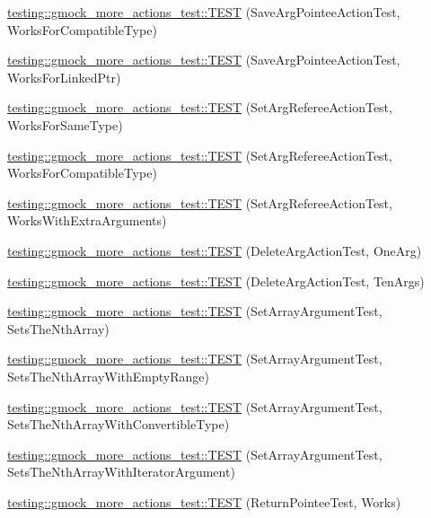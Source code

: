 \begin{DoxyCompactItemize}
\hyperlink{namespacetesting_1_1gmock__more__actions__test_a35b74b32b6a222e048706e6ce8d64118}{testing\+::gmock\+\_\+more\+\_\+actions\+\_\+test\+::\+T\+E\+ST} (Save\+Arg\+Pointee\+Action\+Test, Works\+For\+Compatible\+Type)
\item 
\hyperlink{namespacetesting_1_1gmock__more__actions__test_afc168d80fe8ca16f0efc874587574e64}{testing\+::gmock\+\_\+more\+\_\+actions\+\_\+test\+::\+T\+E\+ST} (Save\+Arg\+Pointee\+Action\+Test, Works\+For\+Linked\+Ptr)
\item 
\hyperlink{namespacetesting_1_1gmock__more__actions__test_aa9fa575b30dca09e9886722b78415a22}{testing\+::gmock\+\_\+more\+\_\+actions\+\_\+test\+::\+T\+E\+ST} (Set\+Arg\+Referee\+Action\+Test, Works\+For\+Same\+Type)
\item 
\hyperlink{namespacetesting_1_1gmock__more__actions__test_af5a15dbcba14010a5463f3ac9451ab8a}{testing\+::gmock\+\_\+more\+\_\+actions\+\_\+test\+::\+T\+E\+ST} (Set\+Arg\+Referee\+Action\+Test, Works\+For\+Compatible\+Type)
\item 
\hyperlink{namespacetesting_1_1gmock__more__actions__test_a0ea4f3d8f1a643726e37825c58d8741f}{testing\+::gmock\+\_\+more\+\_\+actions\+\_\+test\+::\+T\+E\+ST} (Set\+Arg\+Referee\+Action\+Test, Works\+With\+Extra\+Arguments)
\item 
\hyperlink{namespacetesting_1_1gmock__more__actions__test_a575e9a6f5bfcc133188e973147697425}{testing\+::gmock\+\_\+more\+\_\+actions\+\_\+test\+::\+T\+E\+ST} (Delete\+Arg\+Action\+Test, One\+Arg)
\item 
\hyperlink{namespacetesting_1_1gmock__more__actions__test_a972b47a7e96b95606190afa928ea2db4}{testing\+::gmock\+\_\+more\+\_\+actions\+\_\+test\+::\+T\+E\+ST} (Delete\+Arg\+Action\+Test, Ten\+Args)
\item 
\hyperlink{namespacetesting_1_1gmock__more__actions__test_aacf568e3d16b210aa2316ccc2cb6b22d}{testing\+::gmock\+\_\+more\+\_\+actions\+\_\+test\+::\+T\+E\+ST} (Set\+Array\+Argument\+Test, Sets\+The\+Nth\+Array)
\item 
\hyperlink{namespacetesting_1_1gmock__more__actions__test_a63a338ef41086b80dba5729ecd1073e5}{testing\+::gmock\+\_\+more\+\_\+actions\+\_\+test\+::\+T\+E\+ST} (Set\+Array\+Argument\+Test, Sets\+The\+Nth\+Array\+With\+Empty\+Range)
\item 
\hyperlink{namespacetesting_1_1gmock__more__actions__test_a42955fc99954c095f9d7ded3b92c091f}{testing\+::gmock\+\_\+more\+\_\+actions\+\_\+test\+::\+T\+E\+ST} (Set\+Array\+Argument\+Test, Sets\+The\+Nth\+Array\+With\+Convertible\+Type)
\item 
\hyperlink{namespacetesting_1_1gmock__more__actions__test_a5db6a5413414f6d9bb8a24d1f07bf882}{testing\+::gmock\+\_\+more\+\_\+actions\+\_\+test\+::\+T\+E\+ST} (Set\+Array\+Argument\+Test, Sets\+The\+Nth\+Array\+With\+Iterator\+Argument)
\item 
\hyperlink{namespacetesting_1_1gmock__more__actions__test_a690ef20bd9c281781eddcf99b18cff6c}{testing\+::gmock\+\_\+more\+\_\+actions\+\_\+test\+::\+T\+E\+ST} (Return\+Pointee\+Test, Works)
\end{DoxyCompactItemize}
